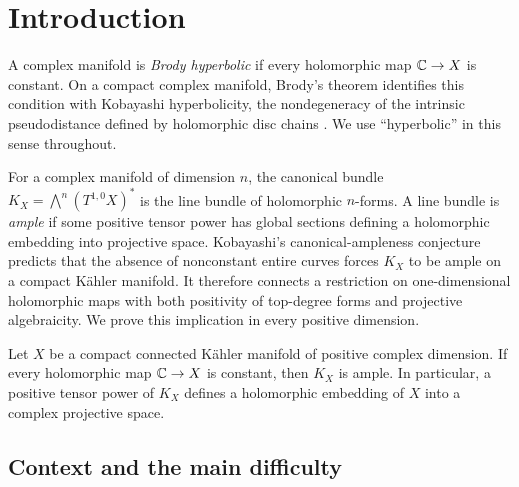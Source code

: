 \section{Introduction}\label{sec:introduction}

A complex manifold is \emph{Brody hyperbolic} if every holomorphic map
$\mathbb C\to X$ is constant. On a compact complex manifold, Brody's theorem
identifies this condition with Kobayashi hyperbolicity, the
nondegeneracy of the intrinsic pseudodistance defined by holomorphic
disc chains \cite{Brody1978,Kobayashi1970}. We use ``hyperbolic'' in
this sense throughout.

For a complex manifold of dimension $n$, the canonical bundle
$K_X=\bigwedge^n(T^{1,0}X)^*$ is the line bundle of holomorphic
$n$-forms. A line bundle is \emph{ample} if some positive tensor power
has global sections defining a holomorphic embedding into projective
space. Kobayashi's canonical-ampleness conjecture predicts that the
absence of nonconstant entire curves forces $K_X$ to be ample on a
compact K\"ahler manifold. It therefore connects a restriction on
one-dimensional holomorphic maps with both positivity of top-degree
forms and projective algebraicity. We prove this implication in every
positive dimension.

\begin{theorem}\label{thm:main}
Let $X$ be a compact connected K\"ahler manifold of positive complex
dimension. If every holomorphic map $\mathbb C\to X$ is constant, then $K_X$ is
ample. In particular, a positive tensor power of $K_X$ defines a
holomorphic embedding of $X$ into a complex projective space.
\end{theorem}

\subsection{Context and the main difficulty}

